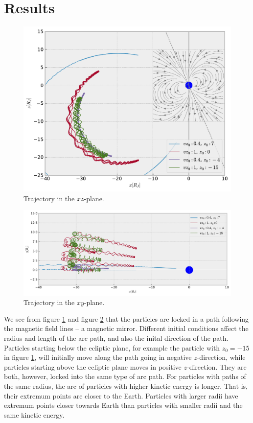 \documentclass[a4paper, 12pt]{article}
\begin{document}
\section{Results}
\begin{figure}[h]
  \centering
  \includegraphics[width=\textwidth]{media/trajectory_xz_plane}
  \caption{Trajectory in the $xz$-plane.\label{fig:trajectory_xz}}
\end{figure}

\begin{figure}[h]
  \centering
  \includegraphics[width=\textwidth]{media/trajectory_xy_plane}
  \caption{Trajectory in the $xy$-plane.\label{fig:trajectory_xy}}
\end{figure}
We see from figure \ref{fig:trajectory_xz} and figure \ref{fig:trajectory_xy} that the particles are locked in a path following the magnetic field lines -- a magnetic mirror.
Different initial conditions affect the radius and length of the arc path, and also the inital direction of the path.
Particles starting below the ecliptic plane, for example the particle with $z_0 = -15$ in figure \ref{fig:trajectory_xz}, will initially move along the path going in negative $z$-direction, while particles starting above the ecliptic plane moves in positive $z$-direction.
They are both, however, locked into the same type of arc path.
For particles with paths of the same radius, the arc of particles with higher kinetic energy is longer.
That is, their extremum points are closer to the Earth.
Particles with larger radii have extremum points closer towards Earth than particles with smaller radii and the same kinetic energy.
\end{document}
